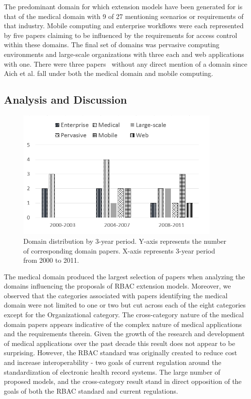 The predominant domain for which extension models have been generated for is that of the medical domain with 9 of 27 mentioning scenarios or requirements of that industry.
Mobile computing and enterprise workflows were each represented by five papers claiming to be influenced by the requirements for access control within these domains. The final set
of domains was pervasive computing environments and large-scale organizations with three each and web applications with one.  There were three papers~\cite{jian2008extended, aich07:STARBAC} without any direct mention of a domain since Aich et al. \cite{aich09:role} fall under both the medical domain and mobile computing.

\subsection{Analysis and Discussion}

\begin{figure}[ht]
    \centering
        \includegraphics[width=4.0in]{sections/dist_domains_byYear.png}
\vspace{-0.2 in}
    \caption{\label{fig:dist_domains}Domain distribution by 3-year period. Y-axis represents the number of corresponding domain papers.
    X-axis represents 3-year period from 2000 to 2011.}
\end{figure}

The medical domain produced the largest selection of papers when analyzing the domains influencing the proposals of RBAC extension models.  
Moreover, we observed that the categories associated with papers identifying the medical domain were not limited to one or two but cut across
each of the eight categories except for the Organizational category. 
The cross-category nature of the medical domain papers appears indicative of the complex nature of medical applications and the requirements therein.
Given the growth of the research and development of medical applications over the past decade this result does not appear to be surprising. However,
the RBAC standard was originally created to reduce cost and increase interoperability - two goals of current regulation around the standardization
of electronic health record systems. The large number of proposed models, and the cross-category result stand in direct opposition of the goals
of both the RBAC standard and current regulations.

